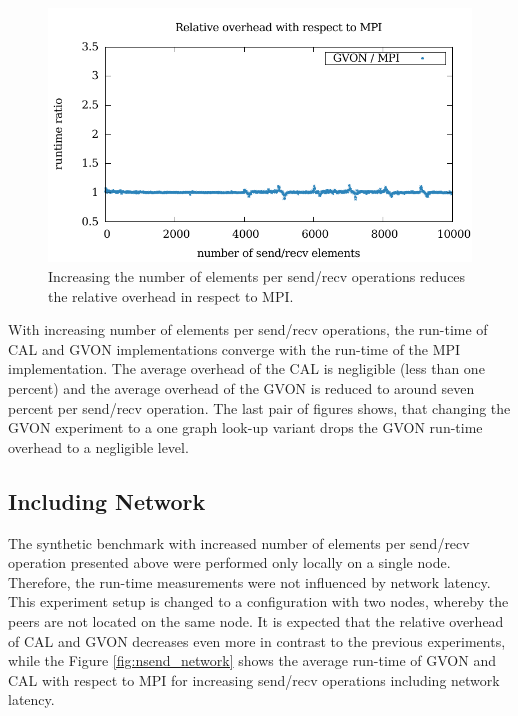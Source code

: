 \begin{figure}[H]
\begin{minipage}[t]{0.5\textwidth}
    \includegraphics[width=\textwidth]{plots/50_nsize_one_lookup_overhead_gvon_laser}
  \end{minipage}%
  \caption{Increasing the number of elements per send/recv operations
    reduces the relative overhead in respect to MPI.}
  \label{fig:nsize_kepler}
\end{figure}

\noindent With increasing number of elements per send/recv operations,
the run-time of CAL and GVON implementations converge with the
run-time of the MPI implementation. The average overhead of the CAL is
negligible (less than one percent) and the average overhead of the
GVON is reduced to around seven percent per send/recv operation. The
last pair of figures shows, that changing the GVON experiment to a one
graph look-up variant drops the GVON run-time overhead to a negligible
level.

\subsection*{Including Network}
The synthetic benchmark with increased number of elements per
send/recv operation presented above were performed only locally on a
single node.  Therefore, the run-time measurements were not influenced
by network latency.  This experiment setup is changed to a
configuration with two nodes, whereby the peers are not located on the
same node. It is expected that the relative overhead of CAL and GVON
decreases even more in contrast to the previous experiments, while the
Figure \ref{fig:nsend_network} shows the average run-time of GVON and
CAL with respect to MPI for increasing send/recv operations including
network latency.

